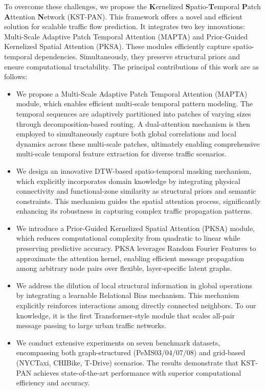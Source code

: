 \documentclass[5p,times,authoryear]{elsarticle}
\begin{document}
To overcome these challenges, we propose the \textbf{K}ernelized \textbf{S}patio-\textbf{T}emporal \textbf{P}atch \textbf{A}ttention \textbf{N}etwork (KST-PAN). This framework offers a novel and efficient solution for scalable traffic flow prediction. It integrates two key innovations: Multi-Scale Adaptive Patch Temporal Attention (MAPTA) and Prior-Guided Kernelized Spatial Attention (PKSA). These modules efficiently capture spatio-temporal dependencies. Simultaneously, they preserve structural priors and ensure computational tractability. The principal contributions of this work are as follows:
\begin{itemize}[nosep]
    \item We propose a Multi-Scale Adaptive Patch Temporal Attention (MAPTA) module, which enables efficient multi-scale temporal pattern modeling. The temporal sequences are adaptively partitioned into patches of varying sizes through decomposition-based routing. A dual-attention mechanism is then employed to simultaneously capture both global correlations and local dynamics across these multi-scale patches, ultimately enabling comprehensive multi-scale temporal feature extraction for diverse traffic scenarios.

    \item We design an innovative DTW-based spatio-temporal masking mechanism, which explicitly incorporates domain knowledge by integrating physical connectivity and functional-zone similarity as structural priors and semantic constraints. This mechanism guides the spatial attention process, significantly enhancing its robustness in capturing complex traffic propagation patterns.

    \item We introduce a Prior-Guided Kernelized Spatial Attention (PKSA) module, which reduces computational complexity from quadratic to linear while preserving predictive accuracy. PKSA leverages Random Fourier Features to approximate the attention kernel, enabling efficient message propagation among arbitrary node pairs over flexible, layer-specific latent graphs. 

    \item We address the dilution of local structural information in global operations by integrating a learnable Relational Bias mechanism. This mechanism explicitly reinforces interactions among directly connected neighbors. To our knowledge, it is the first Transformer-style module that scales all-pair message passing to large urban traffic networks.

    \item We conduct extensive experiments on seven benchmark datasets, encompassing both graph-structured (PeMS03/04/07/08) and grid-based (NYCTaxi, CHIBike, T-Drive) scenarios. The results demonstrate that KST-PAN achieves state-of-the-art performance with superior computational efficiency and accuracy.

\end{itemize}
\end{document}
